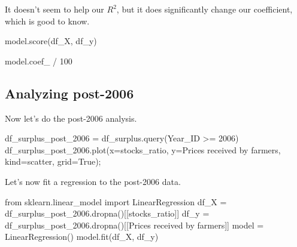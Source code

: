 \documentclass[
  letterpaper,
  DIV=11,
  numbers=noendperiod]{scrreprt}
\newenvironment{Shaded}{\begin{snugshade}}{\end{snugshade}}
\newcommand{\DecValTok}[1]{\textcolor[rgb]{0.68,0.00,0.00}{#1}}
\newcommand{\ImportTok}[1]{\textcolor[rgb]{0.00,0.46,0.62}{#1}}
\newcommand{\NormalTok}[1]{\textcolor[rgb]{0.00,0.23,0.31}{#1}}
\newcommand{\OperatorTok}[1]{\textcolor[rgb]{0.37,0.37,0.37}{#1}}
\newcommand{\StringTok}[1]{\textcolor[rgb]{0.13,0.47,0.30}{#1}}
\newcommand{\VariableTok}[1]{\textcolor[rgb]{0.07,0.07,0.07}{#1}}
\begin{document}
It doesn't seem to help our \(R^2\), but it does significantly change
our coefficient, which is good to know.

\begin{Shaded}
\begin{Highlighting}[]
\NormalTok{model.score(df\_X, df\_y)}
\end{Highlighting}
\end{Shaded}

\begin{Shaded}
\begin{Highlighting}[]
\NormalTok{model.coef\_ }\OperatorTok{/} \DecValTok{100}
\end{Highlighting}
\end{Shaded}

\hypertarget{analyzing-post-2006}{%
\subsection{Analyzing post-2006}\label{analyzing-post-2006}}

Now let's do the post-2006 analysis.

\begin{Shaded}
\begin{Highlighting}[]
\NormalTok{df\_surplus\_post\_2006 }\OperatorTok{=}\NormalTok{ df\_surplus.query(}\StringTok{\textquotesingle{}Year\_ID \textgreater{}= 2006\textquotesingle{}}\NormalTok{)}
\NormalTok{df\_surplus\_post\_2006.plot(x}\OperatorTok{=}\StringTok{\textquotesingle{}stocks\_ratio\textquotesingle{}}\NormalTok{, y}\OperatorTok{=}\StringTok{\textquotesingle{}Prices received by farmers\textquotesingle{}}\NormalTok{, kind}\OperatorTok{=}\StringTok{\textquotesingle{}scatter\textquotesingle{}}\NormalTok{, grid}\OperatorTok{=}\VariableTok{True}\NormalTok{)}\OperatorTok{;}
\end{Highlighting}
\end{Shaded}

Let's now fit a regression to the post-2006 data.

\begin{Shaded}
\begin{Highlighting}[]
\ImportTok{from}\NormalTok{ sklearn.linear\_model }\ImportTok{import}\NormalTok{ LinearRegression}
\NormalTok{df\_X }\OperatorTok{=}\NormalTok{ df\_surplus\_post\_2006.dropna()[[}\StringTok{\textquotesingle{}stocks\_ratio\textquotesingle{}}\NormalTok{]]}
\NormalTok{df\_y }\OperatorTok{=}\NormalTok{ df\_surplus\_post\_2006.dropna()[[}\StringTok{\textquotesingle{}Prices received by farmers\textquotesingle{}}\NormalTok{]]}
\NormalTok{model }\OperatorTok{=}\NormalTok{ LinearRegression()}
\NormalTok{model.fit(df\_X, df\_y)}
\end{Highlighting}
\end{Shaded}
\end{document}
